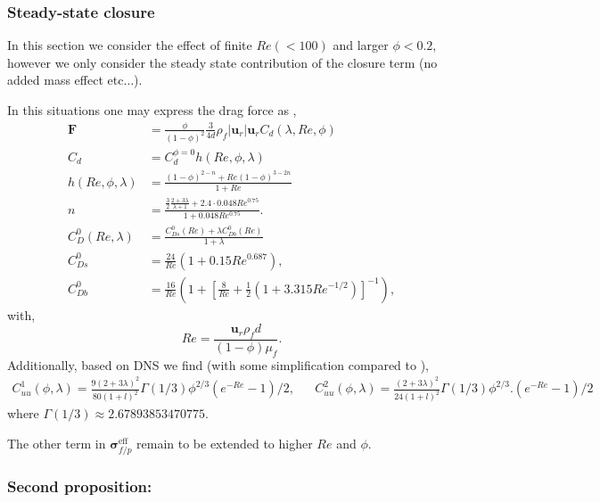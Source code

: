 \documentclass[11pt]{My_preprint}
\begin{document}
\subsubsection{Steady-state closure}
In this section we consider the effect of finite $Re (<100)$ and larger $\phi <0.2$, however we only consider the steady state contribution of the closure term (no added mass effect etc$\ldots$). 

In this situations one may express the drag force as \citep[Chapter 8]{fintzi2025}, 
\begin{align}
    \textbf{F} &= \frac{\phi}{(1-\phi)^2} \frac{3}{4 d} \rho_f |\textbf{u}_r|\textbf{u}_r C_d(\lambda,Re,\phi)\\
    C_d &= C_d^{\phi = 0} h(Re,\phi,\lambda)\\
    h(Re,\phi,\lambda) 
    &=
    \frac{(1-\phi)^{2-n}+ Re (1-\phi)^{3-2n}}{1+Re}\\
    n &= \frac{\frac{3}{2} \frac{2+3\lambda}{\lambda+1} + 2.4 \cdot 0.048 Re^{0.75}}{1+0.048 Re^{0.75}}. \\
    C_D^0(Re,\lambda) &= \frac{C_{Ds}^0(Re)+\lambda C_{Db}^0(Re)}{1+\lambda}\\
    C_{Ds} ^0 &= \frac{24}{Re}(1+0.15Re^{0.687}), \\
    C_{Db} ^0 &= \frac{16}{Re}\left(1+\left[\frac{8}{Re}+\frac{1}{2}\left(1+3.315Re^{-1/2}\right)\right]^{-1}\right),
\end{align}
with,
\begin{equation}
    Re= \frac{\textbf{u}_r \rho_f d}{(1-\phi)\mu_f}. 
\end{equation}
Additionally, based on DNS we find (with some simplification compared to \citet[chapter 8]{fintzi2025}), 
\begin{align*}
    C^1_{uu}(\phi,\lambda)
    = \frac{9(2+3\lambda)^2}{80(1+l)^2}
        \Gamma(1/3) \phi^{2/3}
        (e^{-Re} - 1)/2
    ,
    &&
    C^2_{uu}(\phi,\lambda)
    = \frac{(2+3\lambda)^2}{24(1+l)^2}
        \Gamma(1/3) \phi^{2/3}.
        (e^{-Re} - 1)/2
\end{align*}
where $\Gamma(1/3) \approx 2.67893853470775$. 

The other term in $\bm\sigma_{f/p}^\text{eff}$ remain to be extended to higher $Re$ and $\phi$. 


\subsubsection{Second proposition:}
\end{document}
